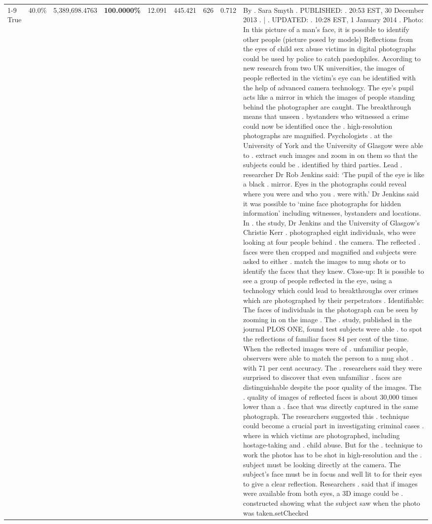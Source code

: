 \begin{table}[H]
\begin{tabular}{lllrlllll}
\cline{1-9}
True & 40.0\% & 5,389,698.4763 & \bfseries \color{red} 100.0000\% & 12.091 & 445.421 & 626 & 0.712 & By . Sara Smyth . PUBLISHED: . 20:53 EST, 30 December 2013 . | . UPDATED: . 10:28 EST, 1 January 2014 . Photo: In this picture of a man's face, it is possible to identify other people (picture posed by models) Reflections from the eyes of child sex abuse victims in digital photographs could be used by police to catch paedophiles. According to new research from two UK universities, the images of people reflected in the victim's eye can be identified with the help of advanced camera technology. The eye's pupil acts like a mirror in which the images of people standing behind the photographer are caught. The breakthrough means that unseen . bystanders who witnessed a crime could now be identified once the . high-resolution photographs are magnified. Psychologists . at the University of York and the University of Glasgow were able to . extract such images and zoom in on them so that the subjects could be . identified by third parties. Lead . researcher Dr Rob Jenkins said: ‘The pupil of the eye is like a black . mirror. Eyes in the photographs could reveal where you were and who you . were with.' Dr Jenkins said it was possible to ‘mine face photographs for hidden information' including witnesses, bystanders and locations. In . the study, Dr Jenkins and the University of Glasgow's Christie Kerr . photographed eight individuals, who were looking at four people behind . the camera. The reflected . faces were then cropped and magnified and subjects were asked to either . match the images to mug shots or to identify the faces that they knew. Close-up: It is possible to see a group of people reflected in the eye, using a technology which could lead to breakthroughs over crimes which are photographed by their perpetrators . Identifiable: The faces of individuals in the photograph can be seen by zooming in on the image . The . study, published in the journal PLOS ONE, found test subjects were able . to spot the reflections of familiar faces 84 per cent of the time. When the reflected images were of . unfamiliar people, observers were able to match the person to a mug shot . with 71 per cent accuracy. The . researchers said they were surprised to discover that even unfamiliar . faces are distinguishable despite the poor quality of the images. The . quality of images of reflected faces is about 30,000 times lower than a . face that was directly captured in the same photograph. The researchers suggested this . technique could become a crucial part in investigating criminal cases . where in which victims are photographed, including hostage-taking and . child abuse. But for the . technique to work the photos has to be shot in high-resolution and the . subject must be looking directly at the camera. The subject's face must be in focus and well lit to for their eyes to give a clear reflection. Researchers . said that if images were available from both eyes, a 3D image could be . constructed showing what the subject saw when the photo was taken.setChecked \\

\end{tabular}
\end{table}
